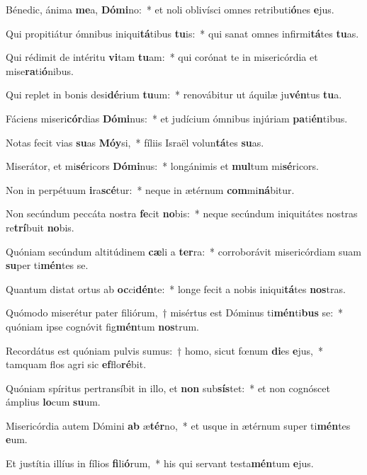 \item Bénedic, ánima \textbf{me}a, \textbf{Dó}\textbf{mi}no:~* et noli oblivísci omnes retributi\textbf{ó}nes \textbf{e}jus.
\item Qui propitiátur ómnibus iniqui\textbf{tá}tibus \textbf{tu}is:~* qui sanat omnes infirmi\textbf{tá}tes \textbf{tu}as.
\item Qui rédimit de intéritu \textbf{vi}tam \textbf{tu}am:~* qui corónat te in misericórdia et mise\textbf{ra}ti\textbf{ó}nibus.
\item Qui replet in bonis desi\textbf{dé}rium \textbf{tu}um:~* renovábitur ut áquilæ ju\textbf{vén}tus \textbf{tu}a.
\item Fáciens miseri\textbf{cór}dias \textbf{Dó}\textbf{mi}nus:~* et judícium ómnibus injúriam \textbf{pa}ti\textbf{én}tibus.
\item Notas fecit vias \textbf{su}as \textbf{Mó}\textbf{y}si,~* fíliis Israël volun\textbf{tá}tes \textbf{su}as.
\item Miserátor, et mi\textbf{sé}ricors \textbf{Dó}\textbf{mi}nus:~* longánimis et \textbf{mul}tum mi\textbf{sé}ricors.
\item Non in perpétuum \textbf{i}ra\textbf{scé}tur:~* neque in ætérnum \textbf{com}mi\textbf{ná}bitur.
\item Non secúndum peccáta nostra \textbf{fe}cit \textbf{no}bis:~* neque secúndum iniquitátes nostras re\textbf{trí}buit \textbf{no}bis.
\item Quóniam secúndum altitúdinem \textbf{cæ}li a \textbf{ter}ra:~* corroborávit misericórdiam suam \textbf{su}per ti\textbf{mén}tes se.
\item Quantum distat ortus ab \textbf{oc}ci\textbf{dén}te:~* longe fecit a nobis iniqui\textbf{tá}tes \textbf{nos}tras.
\item Quómodo miserétur pater filiórum,~† misértus est Dóminus ti\textbf{mén}ti\textbf{bus} se:~* quóniam ipse cognóvit fig\textbf{mén}tum \textbf{nos}trum.
\item Recordátus est quóniam pulvis sumus:~† homo, sicut fœnum \textbf{di}es \textbf{e}jus,~* tamquam flos agri sic \textbf{ef}flo\textbf{ré}bit.
\item Quóniam spíritus pertransíbit in illo, et \textbf{non} sub\textbf{sís}tet:~* et non cognóscet ámplius \textbf{lo}cum \textbf{su}um.
\item Misericórdia autem Dómini \textbf{ab} æ\textbf{tér}no,~* et usque in ætérnum super ti\textbf{mén}tes \textbf{e}um.
\item Et justítia illíus in fílios \textbf{fi}li\textbf{ó}rum,~* his qui servant testa\textbf{mén}tum \textbf{e}jus.

